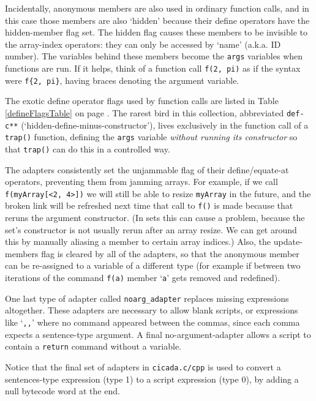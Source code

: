 \documentclass{article}
\begin{document}
Incidentally, anonymous members are also used in ordinary function calls, and in this case those members are also `hidden' because their define operators have the hidden-member flag set.  The hidden flag causes these members to be invisible to the array-index operators:  they can only be accessed by `name' (a.k.a. ID number).  The variables behind these members become the \verb#args# variables when functions are run.  If it helps, think of a function call \verb#f(2, pi)# as if the syntax were \verb#f{2, pi}#, having braces denoting the argument variable.

The exotic define operator flags used by function calls are listed in Table \ref{defineFlagsTable} on page \pageref{defineFlagsTable}.  The rarest bird in this collection, abbreviated \verb#def-c**# (`hidden-define-minus-constructor'), lives exclusively in the function call of a \verb#trap()# function, defining the \verb#args# variable \emph{without running its constructor} so that \verb#trap()# can do this in a controlled way.

The adapters consistently set the unjammable flag of their define/equate-at operators, preventing them from jamming arrays.  For example, if we call \verb#f(myArray[<2, 4>])# we will still be able to resize \verb#myArray# in the future, and the broken link will be refreshed next time that call to \verb#f()# is made because that reruns the argument constructor.  (In sets this can cause a problem, because the set's constructor is not usually rerun after an array resize.  We can get around this by manually aliasing a member to certain array indices.)  Also, the update-members flag is cleared by all of the adapters, so that the anonymous member can be re-assigned to a variable of a different type (for example if between two iterations of the command \verb#f(a)# member `\verb#a#' gets removed and redefined).

One last type of adapter called \verb#noarg_adapter# replaces missing expressions altogether.  These adapters are necessary to allow blank scripts, or expressions like `\verb#,,#' where no command appeared between the commas, since each comma expects a sentence-type argument.  A final no-argument-adapter allows a script to contain a \verb#return# command without a variable.

Notice that the final set of adapters in \verb#cicada.c/cpp# is used to convert a sentences-type expression (type 1) to a script expression (type 0), by adding a null bytecode word at the end.\\
\end{document}
